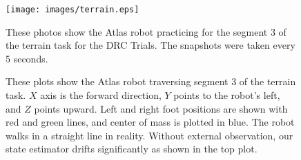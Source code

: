 \documentclass{ws-ijhr}
\begin{document}
\begin{figure}
  \begin{center}
    {\texttt{[image: images/terrain.eps]}}
    \caption{
      These photos show the Atlas robot practicing for the segment 3 of the 
      terrain task for the DRC Trials. The snapshots were taken every 5 seconds.
      }\label{fig:terrain_pic} 
  \end{center}
\end{figure}

\begin{figure}
  \begin{center}
    \caption{                    
      These plots show the Atlas robot traversing segment 3 of the terrain 
      task. 
      $X$ axis is the forward direction, $Y$ points to the robot's left, and
      $Z$ points upward. 
      Left and right foot positions are shown with red and green 
      lines, and center of mass is plotted in blue. The robot walks in a 
      straight line in reality. Without external observation, our state estimator
      drifts significantly as shown in the top plot.
      }\label{fig:walk_com} 
  \end{center}
\end{figure}     
\end{document}
